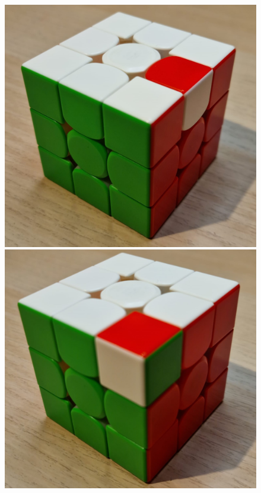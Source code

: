\begin{figure}[ht]
    \centering
    \begin{minipage}[b]{0.2\textwidth}
      \includegraphics[width=\textwidth]{img/figures/impossible-edge.jpg}
    \end{minipage}
    \hfill
    \begin{minipage}[b]{0.2\textwidth}
      \includegraphics[width=\textwidth]{img/figures/impossible-corner.jpg}

\end{minipage}
\end{figure}
